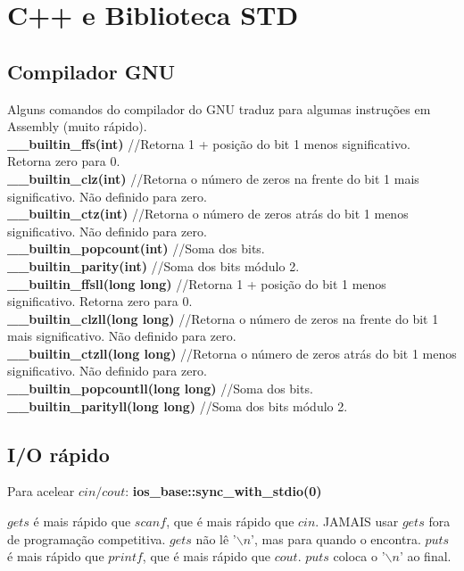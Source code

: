 \chapter{C++ e Biblioteca STD}

\begin{multicols}{2}

\section{Compilador GNU}

Alguns comandos do compilador do GNU traduz para algumas instruções em Assembly (muito rápido). \\

\textbf{\_\_builtin\_ffs(int)}	//Retorna 1 + posição do bit 1 menos significativo. Retorna zero para 0.\\
\textbf{\_\_builtin\_clz(int)}	//Retorna o número de zeros na frente do bit 1 mais significativo. Não definido para zero.\\
\textbf{\_\_builtin\_ctz(int)}	//Retorna o número de zeros atrás do bit 1 menos significativo. Não definido para zero.\\
\textbf{\_\_builtin\_popcount(int)}	//Soma dos bits.\\
\textbf{\_\_builtin\_parity(int)}	//Soma dos bits módulo 2.\\

\textbf{\_\_builtin\_ffsll(long long)}	//Retorna 1 + posição do bit 1 menos significativo. Retorna zero para 0.\\
\textbf{\_\_builtin\_clzll(long long)}	//Retorna o número de zeros na frente do bit 1 mais significativo. Não definido para zero.\\
\textbf{\_\_builtin\_ctzll(long long)}	//Retorna o número de zeros atrás do bit 1 menos significativo. Não definido para zero.\\
\textbf{\_\_builtin\_popcountll(long long)}	//Soma dos bits.\\
\textbf{\_\_builtin\_parityll(long long)}	//Soma dos bits módulo 2.\\

\section{I/O rápido}

Para acelear $cin/cout$: \textbf{ios\_base::sync\_with\_stdio(0)}

$gets$ é mais rápido que $scanf$, que é mais rápido que $cin$. JAMAIS usar $gets$ fora de programação competitiva. $gets$ não lê '$\backslash n$', mas para quando o encontra. $puts$ é mais rápido que $printf$, que é mais rápido que $cout$. $puts$ coloca o '$\backslash n$' ao final.


\end{multicols}
